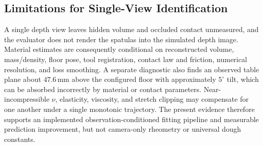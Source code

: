 \subsection{Limitations for Single-View Identification}
A single depth view leaves hidden volume and occluded contact unmeasured, and the evaluator does not render the spatulas into the simulated depth image. Material estimates are consequently conditional on reconstructed volume, mass/density, floor pose, tool registration, contact law and friction, numerical resolution, and loss smoothing. A separate diagnostic also finds an observed table plane about $47.6$\,mm above the configured floor with approximately $5^{\circ}$ tilt, which can be absorbed incorrectly by material or contact parameters. Near-incompressible $\nu$, elasticity, viscosity, and stretch clipping may compensate for one another under a single monotonic trajectory. The present evidence therefore supports an implemented observation-conditioned fitting pipeline and measurable prediction improvement, but not camera-only rheometry or universal dough constants.

\FloatBarrier
